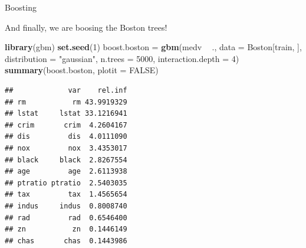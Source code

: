 \documentclass[10pt,ignorenonframetext,]{beamer}
\newenvironment{Shaded}{\begin{snugshade}}{\end{snugshade}}
\newcommand{\KeywordTok}[1]{\textcolor[rgb]{0.13,0.29,0.53}{\textbf{#1}}}
\newcommand{\DataTypeTok}[1]{\textcolor[rgb]{0.13,0.29,0.53}{#1}}
\newcommand{\DecValTok}[1]{\textcolor[rgb]{0.00,0.00,0.81}{#1}}
\newcommand{\StringTok}[1]{\textcolor[rgb]{0.31,0.60,0.02}{#1}}
\newcommand{\OtherTok}[1]{\textcolor[rgb]{0.56,0.35,0.01}{#1}}
\newcommand{\OperatorTok}[1]{\textcolor[rgb]{0.81,0.36,0.00}{\textbf{#1}}}
\newcommand{\NormalTok}[1]{#1}
\begin{document}
\begin{frame}[fragile]

\begin{block}{Boosting}

\vspace{2mm}

And finally, we are boosing the Boston trees!

\scriptsize

\begin{Shaded}
\begin{Highlighting}[]
\KeywordTok{library}\NormalTok{(gbm)}
\KeywordTok{set.seed}\NormalTok{(}\DecValTok{1}\NormalTok{)}
\NormalTok{boost.boston =}\StringTok{ }\KeywordTok{gbm}\NormalTok{(medv }\OperatorTok{~}\StringTok{ }\NormalTok{., }\DataTypeTok{data =}\NormalTok{ Boston[train, ], }\DataTypeTok{distribution =} \StringTok{"gaussian"}\NormalTok{, }
    \DataTypeTok{n.trees =} \DecValTok{5000}\NormalTok{, }\DataTypeTok{interaction.depth =} \DecValTok{4}\NormalTok{)}
\KeywordTok{summary}\NormalTok{(boost.boston, }\DataTypeTok{plotit =} \OtherTok{FALSE}\NormalTok{)}
\end{Highlighting}
\end{Shaded}

\begin{verbatim}
##             var    rel.inf
## rm           rm 43.9919329
## lstat     lstat 33.1216941
## crim       crim  4.2604167
## dis         dis  4.0111090
## nox         nox  3.4353017
## black     black  2.8267554
## age         age  2.6113938
## ptratio ptratio  2.5403035
## tax         tax  1.4565654
## indus     indus  0.8008740
## rad         rad  0.6546400
## zn           zn  0.1446149
## chas       chas  0.1443986
\end{verbatim}

\end{block}

\end{frame}
\end{document}
